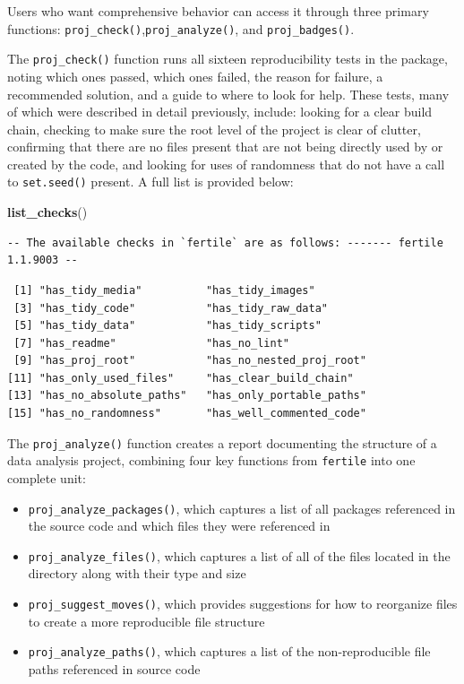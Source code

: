\documentclass[12pt,twoside]{reedthesis}
\newenvironment{Shaded}{\begin{snugshade}}{\end{snugshade}}
\newcommand{\KeywordTok}[1]{\textcolor[rgb]{0.13,0.29,0.53}{\textbf{#1}}}
\newcommand{\NormalTok}[1]{#1}
\providecommand{\tightlist}{%
  \setlength{\itemsep}{0pt}\setlength{\parskip}{0pt}}
\begin{document}
Users who want comprehensive behavior can access it through three primary functions: \texttt{proj\_check()},\texttt{proj\_analyze()}, and \texttt{proj\_badges()}.

The \texttt{proj\_check()} function runs all sixteen reproducibility tests in the package, noting which ones passed, which ones failed, the reason for failure, a recommended solution, and a guide to where to look for help. These tests, many of which were described in detail previously, include: looking for a clear build chain, checking to make sure the root level of the project is clear of clutter, confirming that there are no files present that are not being directly used by or created by the code, and looking for uses of randomness that do not have a call to \texttt{set.seed()} present. A full list is provided below:
\begin{Shaded}
\begin{Highlighting}[]
\KeywordTok{list_checks}\NormalTok{()}
\end{Highlighting}
\end{Shaded}
\begin{verbatim}
-- The available checks in `fertile` are as follows: ------- fertile 1.1.9003 --
\end{verbatim}
\begin{verbatim}
 [1] "has_tidy_media"          "has_tidy_images"        
 [3] "has_tidy_code"           "has_tidy_raw_data"      
 [5] "has_tidy_data"           "has_tidy_scripts"       
 [7] "has_readme"              "has_no_lint"            
 [9] "has_proj_root"           "has_no_nested_proj_root"
[11] "has_only_used_files"     "has_clear_build_chain"  
[13] "has_no_absolute_paths"   "has_only_portable_paths"
[15] "has_no_randomness"       "has_well_commented_code"
\end{verbatim}
The \texttt{proj\_analyze()} function creates a report documenting the structure of a data analysis project, combining four key functions from \texttt{fertile} into one complete unit:
\begin{itemize}
\tightlist
\item
  \texttt{proj\_analyze\_packages()}, which captures a list of all packages referenced in the source code and which files they were referenced in
\item
  \texttt{proj\_analyze\_files()}, which captures a list of all of the files located in the directory along with their type and size
\item
  \texttt{proj\_suggest\_moves()}, which provides suggestions for how to reorganize files to create a more reproducible file structure
\item
  \texttt{proj\_analyze\_paths()}, which captures a list of the non-reproducible file paths referenced in source code
\end{itemize}
\end{document}
